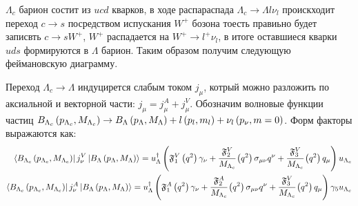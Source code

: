 
$\Lambda_c$ барион состит из $ucd$ кварков, в ходе распараспада 
$\Lambda_c \rightarrow \Lambda l \nu_l$ проискходит переход $c\to s$ 
посредством испускания $W^+$ бозона тоесть правиьно будет записвть $c\to s W^+$,
$W^+$ распадается на $W^+ \to l^+ \nu_l$, в итоге оставшиеся кварки 
$uds$ формируются в $\Lambda$ барион. Таким образом получим следующую 
феймановскую диаграмму.

\begin{figure}[H]
    \centering
\end{figure}

Переход $\Lambda_c \to \Lambda$ индуцирется слабым током $j_\mu$, 
котрый можно разложить по аксиальной и векторной части: 
$j_\mu = j_\mu^A + j_\mu^V$.
Обозначим волновые функции частиц
$B_{\Lambda_c} \left( p_{\Lambda_c}, M_{\Lambda_c} \right) 
\to B_{\Lambda} \left( p_{\Lambda}, M_{\Lambda} \right) 
+ l\left( p_l, m_l \right) + \nu_l \left( p_\nu, m = 0 \right)$. 
Форм факторы выражаются как:
\begin{eqnarray}
    \bra{B_{\Lambda_c} \left( p_{\Lambda_c}, M_{\Lambda_c} \right)}
    j_\nu^V
    \ket{B_{\Lambda} \left( p_{\Lambda}, M_{\Lambda} \right)} = 
    u_\Lambda^\dag \left( \mathfrak F^V_1 \left( q^2 \right) \gamma_\nu + 
    \cfrac{\mathfrak F^V_2}{M_{\Lambda_c}} \left( q^2 \right) \sigma_{\mu\nu} q^\nu + 
    \cfrac{\mathfrak F^V_3}{M_{\Lambda_c}} \left( q^2 \right)q_\mu \right) u_{\Lambda_c} \\
    \bra{B_{\Lambda_c} \left( p_{\Lambda_c}, M_{\Lambda_c} \right)}
    j_\nu^A
    \ket{B_{\Lambda} \left( p_{\Lambda}, M_{\Lambda} \right)} = 
    u_\Lambda^\dag \left( \mathfrak F^A_1 \left( q^2 \right) \gamma_\nu + 
    \cfrac{\mathfrak F^A_2}{M_{\Lambda_c}} \left( q^2 \right) \sigma_{\mu\nu} q^\nu + 
    \cfrac{\mathfrak F^V_3}{M_{\Lambda_c}} \left( q^2 \right)q_\mu \right) \gamma_5 u_{\Lambda_c} 
    \label{eq:def_form}
\end{eqnarray}

